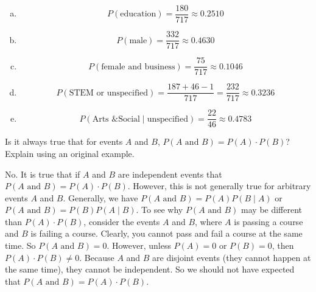 \documentclass[11pt,letterpaper]{article}
\begin{document}
\begin{enumerate}[(a)]
\item 
	\[
	P(\text{education})= \dfrac{180}{717} \approx 0.2510
	\]

\item 
	\[
	P(\text{male})= \dfrac{332}{717} \approx 0.4630
	\]

\item 
	\[
	P(\text{female and business})= \dfrac{75}{717} \approx 0.1046
	\]

\item 
	\[
	P(\text{STEM or unspecified})= \dfrac{187 + 46 - 1}{717}= \dfrac{232}{717} \approx 0.3236
	\]

\item 
	\[
	P(\text{Arts \& Social} \;|\; \text{unspecified})= \dfrac{22}{46} \approx 0.4783
	\]
\end{enumerate}



\newpage



 Is it always true that for events $A$ and $B$, $P(A \text{ and } B)= P(A) \cdot P(B)$? Explain using an original example. \pspace

\sol No. It is true that if $A$ and $B$ are independent events that $P(A \text{ and } B)= P(A) \cdot P(B)$. However, this is not generally true for arbitrary events $A$ and $B$. Generally, we have $P(A \text{ and } B)= P(A) P(B \;|\; A)$ or $P(A \text{ and } B)= P(B) P(A \;|\; B)$. To see why $P(A \text{ and } B)$ may be different than $P(A) \cdot P(B)$, consider the events $A$ and $B$, where $A$ is passing a course and $B$ is failing a course. Clearly, you cannot pass and fail a course at the same time. So $P(A \text{ and } B)= 0$. However, unless $P(A)= 0$ or $P(B)= 0$, then $P(A) \cdot P(B) \neq 0$. Because $A$ and $B$ are disjoint events (they cannot happen at the same time), they cannot be independent. So we should not have expected that $P(A \text{ and } B)= P(A) \cdot P(B)$. 
\end{document}
